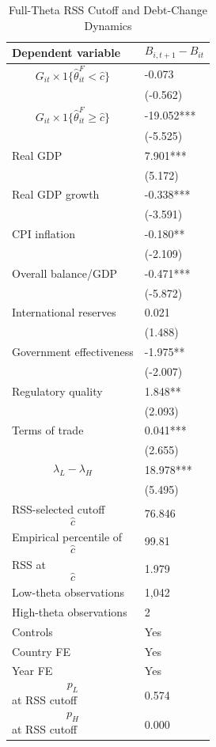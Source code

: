 \begin{table}[H]\centering
\begin{threeparttable}
\caption{Full-Theta RSS Cutoff and Debt-Change Dynamics}
\label{tab:deltaB_rss_cutoff_fulltheta}
\scriptsize
\begin{tabularx}{\textwidth}{lY}
\toprule
Dependent variable & $$B_{i,t+1}-B_{it}$$ \\
\midrule
$$G_{it}\times 1\{\widehat{\theta}^{F}_{it}<\widehat{c}\}$$ & -0.073 \\
 & (-0.562) \\
$$G_{it}\times 1\{\widehat{\theta}^{F}_{it}\geq\widehat{c}\}$$ & -19.052*** \\
 & (-5.525) \\
Real GDP & 7.901*** \\
 & (5.172) \\
Real GDP growth & -0.338*** \\
 & (-3.591) \\
CPI inflation & -0.180** \\
 & (-2.109) \\
Overall balance/GDP & -0.471*** \\
 & (-5.872) \\
International reserves & 0.021 \\
 & (1.488) \\
Government effectiveness & -1.975** \\
 & (-2.007) \\
Regulatory quality & 1.848** \\
 & (2.093) \\
Terms of trade & 0.041*** \\
 & (2.655) \\
$$\lambda_L-\lambda_H$$ & 18.978*** \\
 & (5.495) \\
\midrule
RSS-selected cutoff $$\widehat{c}$$ & 76.846 \\
Empirical percentile of $$\widehat{c}$$ & 99.81 \\
RSS at $$\widehat{c}$$ & 1.979 \\
Low-theta observations & 1,042 \\
High-theta observations & 2 \\
Controls & Yes \\
Country FE & Yes \\
Year FE & Yes \\
$$p_L$$ at RSS cutoff & 0.574 \\
$$p_H$$ at RSS cutoff & 0.000 \\

\end{tabularx}
\end{threeparttable}
\end{table}
